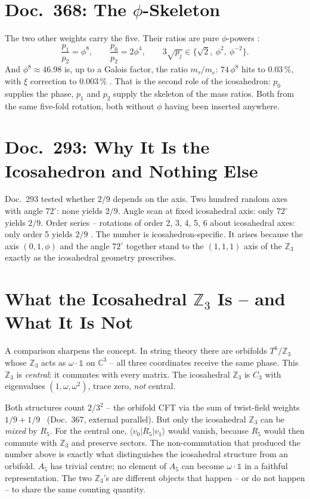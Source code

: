 \section{Doc.~368: The $\phi$-Skeleton}

The two other weights carry the five. Their ratios are pure $\phi$-powers \BM:
\[
  \frac{p_1}{p_2} = \phi^8, \qquad \frac{p_0}{p_2} = 2\phi^4, \qquad
  3\sqrt{p_j} \in \{\sqrt2,\ \phi^2,\ \phi^{-2}\}.
\]
And $\phi^8 \approx 46{.}98$ is, up to a Galois factor, the ratio $m_\tau/m_e$:
$74\,\phi^8$ hits to $0{.}03\,\%$, with $\xi$ correction to $0{.}003\,\%$ \KM.
That is the second role of the icosahedron: $p_0$ supplies the phase, $p_1$ and
$p_2$ supply the skeleton of the mass ratios. Both from the same five-fold
rotation, both without $\phi$ having been inserted anywhere.

\section{Doc.~293: Why It Is the Icosahedron and Nothing Else}

Doc.~293 tested whether $2/9$ depends on the axis. Two hundred random axes with
angle $72^\circ$: none yields $2/9$. Angle scan at fixed icosahedral axis: only
$72^\circ$ yields $2/9$. Order series -- rotations of order 2, 3, 4, 5, 6 about
icosahedral axes: only order 5 yields $2/9$ \KM. The number is
icosahedron-specific. It arises because the axis $(0,1,\phi)$ and the angle
$72^\circ$ together stand to the $(1,1,1)$ axis of the $\mathbb{Z}_3$ exactly
as the icosahedral geometry prescribes.

\section{What the Icosahedral $\mathbb{Z}_3$ Is -- and What It Is Not}

A comparison sharpens the concept. In string theory there are orbifolds
$T^6/\mathbb{Z}_3$ whose $\mathbb{Z}_3$ acts as $\omega\cdot\mathbb{1}$ on
$\mathbb{C}^3$ -- all three coordinates receive the same phase. This
$\mathbb{Z}_3$ is \emph{central}: it commutes with every matrix. The icosahedral
$\mathbb{Z}_3$ is $C_3$ with eigenvalues $(1,\omega,\omega^2)$, trace zero,
\emph{not} central.

Both structures count $2/3^2$ -- the orbifold CFT via the sum of twist-field
weights $1/9+1/9$ \EM~(Doc.~367, external parallel). But only the icosahedral
$\mathbb{Z}_3$ can be \emph{mixed} by $R_5$. For the central one,
$\langle v_0|R_5|v_1\rangle$ would vanish, because $R_5$ would then commute with
$\mathbb{Z}_3$ and preserve sectors. The non-commutation that produced the
number above is exactly what distinguishes the icosahedral structure from an
orbifold. $A_5$ has trivial centre; no element of $A_5$ can become
$\omega\cdot\mathbb{1}$ in a faithful representation. The two $\mathbb{Z}_3$'s
are different objects that happen -- or do not happen -- to share the same
counting quantity.

